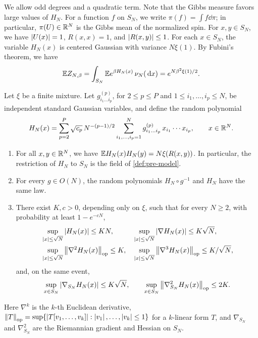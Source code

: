 We allow odd degrees and a quadratic term. Note that the Gibbs measure favors large values of $H_N$. For a function $f$ on $S_N$, we write $\pi(f)=\int f\dd\pi$; in particular, $\pi(U)\in\mathbb R^N$ is the Gibbs mean of the normalized spin. For $x,y\in S_N$, we have $\left|U(x)\right|=1$, $R(x,x)=1$, and $\left|R(x,y)\right|\le1$. For each $x\in S_N$, the variable $H_N(x)$ is centered Gaussian with variance $N\xi(1)$. By Fubini's theorem, we have
\begin{equation}\label{eq:pre-EZ}
\mathbb E Z_{N,\beta}=\int_{S_N}\mathbb E e^{\beta H_N(x)}\,\nu_N(\,\mathrm d x)=e^{N\beta^2\xi(1)/2}.
\end{equation}

\begin{lemma}\label{lem:pre-field}
Let $\xi$ be a finite mixture. Let $g^{(p)}_{i_1\dots i_p}$, for $2\le p\le P$ and $1\le i_1,\dots,i_p\le N$, be independent standard Gaussian variables, and define the random polynomial
\begin{equation}\label{eq:pre-tensor}
H_N(x)=\sum_{p=2}^P\sqrt{c_p}\,N^{-(p-1)/2}\sum_{i_1,\dots,i_p=1}^Ng^{(p)}_{i_1\dots i_p}\,x_{i_1}\cdots x_{i_p},\qquad x\in\mathbb R^N.
\end{equation}
\begin{enumerate}
\item For all $x,y\in\mathbb R^N$, we have $\mathbb E H_N(x)H_N(y)=N\xi(R(x,y))$. In particular, the restriction of $H_N$ to $S_N$ is the field of \cref{def:pre-model}.
\item For every $g\in O(N)$, the random polynomials $H_N\circ g^{-1}$ and $H_N$ have the same law.
\item There exist $K,c>0$, depending only on $\xi$, such that for every $N\ge2$, with probability at least $1-e^{-cN}$,
\begin{equation}\label{eq:pre-field-ball}
\begin{aligned}
&\sup_{\left|x\right|\le\sqrt N}\left|H_N(x)\right|\le KN,&&\sup_{\left|x\right|\le\sqrt N}\left|\nabla H_N(x)\right|\le K\sqrt N,\\
&\sup_{\left|x\right|\le\sqrt N}\left\lVert\nabla^2H_N(x)\right\rVert_{\rm op}\le K,&&\sup_{\left|x\right|\le\sqrt N}\left\lVert\nabla^3H_N(x)\right\rVert_{\rm op}\le K/\sqrt N,
\end{aligned}
\end{equation}
and, on the same event,
\begin{equation}\label{eq:pre-field-sphere}
\sup_{x\in S_N}\left|\nabla_{S_N}H_N(x)\right|\le K\sqrt N,\qquad\sup_{x\in S_N}\left\lVert\nabla^2_{S_N}H_N(x)\right\rVert_{\rm op}\le2K.
\end{equation}
\end{enumerate}
Here $\nabla^k$ is the $k$-th Euclidean derivative, $\left\lVert T\right\rVert_{\rm op}=\sup\{\left|T[v_1,\dots,v_k]\right|:\left|v_1\right|,\dots,\left|v_k\right|\le1\}$ for a $k$-linear form $T$, and $\nabla_{S_N}$ and $\nabla^2_{S_N}$ are the Riemannian gradient and Hessian on $S_N$.
\end{lemma}

